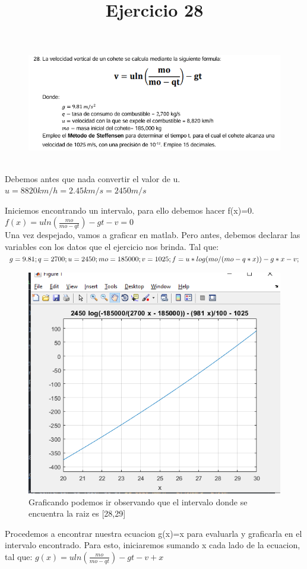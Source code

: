 \documentclass{article}
\title{Ejercicio 28}
\theoremstyle{mytheoremstyle}
\theoremstyle{mytheoremstyle}
\theoremstyle{myproblemstyle}
\begin{document}
    \begin{figure}[ht]
        \includegraphics[scale=0.9]{img/stf28_1.png}
    \end{figure}
    \noindent \\Debemos antes que nada convertir el valor de u. $u=8820 km/h = 2.45km/s= 2450m/s$
    
    Iniciemos encontrando un intervalo, para ello debemos hacer f(x)=0.
    \\$ f(x)=uln(\frac{mo}{mo-qt})-gt-v=0$
    \\Una vez despejado, vamos a graficar en matlab. Pero antes, debemos declarar las variables con los datos que el ejercicio nos brinda.
    Tal que:
    $
    g=9.81;\\
    q=2700;\\
    u=2450;\\
    mo=185000;\\
    v=1025;\\
    f=u*log(mo/(mo-q*x))-g*x-v;
    $
    
    \begin{figure}[ht]
        \includegraphics[scale=0.5]{img/stf28_2.png}{\\Graficando podemos ir observando que el intervalo donde se encuentra la raiz es [28,29]}
    \end{figure}
    \pagebreak
    \noindent Procedemos a encontrar nuestra ecuacion g(x)=x para evaluarla y graficarla en el intervalo encontrado.
Para esto, iniciaremos sumando x cada lado de la ecuacion, tal que:
$g(x)=uln(\frac{mo}{mo-qt})-gt-v+x$
\end{document}
